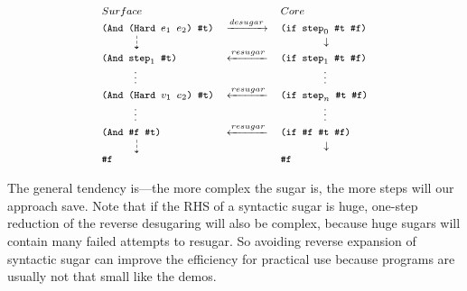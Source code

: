 \[
{\footnotesize
	\begin{array}{lcl}
	Surface&&Core\\
	\Code{(And (Hard $e_1$ $e_2$) \#t)}&\xrightarrow{desugar}&\Code{(if $\m{step}_0$ \#t \#f)}\\
	\qquad\quad\dashdownarrow& &\qquad\qquad\downarrow\\
	\Code{(And $\m{step}_1$ \#t)}&\xleftarrow{resugar}&\Code{(if $\m{step}_1$ \#t \#f)}\\
	\qquad\quad\vdots& &\qquad\qquad\vdots\\
	\Code{(And (Hard $v_1$ $e_2$) \#t)}&\xleftarrow{resugar}&\Code{(if $\m{step}_n$ \#t \#f)}\\
	\qquad\quad\vdots& &\qquad\qquad\vdots\\
	\Code{(And \#f \#t)}&\xleftarrow{resugar}& \Code{(if \#f \#t \#f)}\\
	\qquad\quad\dashdownarrow& &\qquad\qquad\downarrow\\
	\Code{\#f}&& \Code{\#f}\\
\end{array}
}
\]


The general tendency is---the more complex the sugar is, the more steps will our approach save. Note that if the RHS of a syntactic sugar is huge, one-step reduction of the reverse desugaring will also be complex, because huge sugars will contain many failed attempts to resugar. So avoiding reverse expansion of syntactic sugar can improve the efficiency for practical use because programs are usually not that small like the demos.

